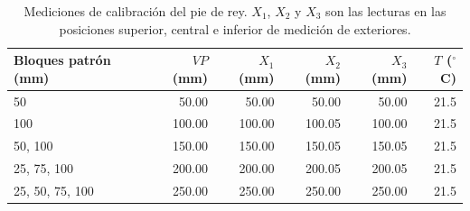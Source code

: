 \begin{table}[H]
\centering
\caption{Mediciones de calibración del pie de rey. $X_1$, $X_2$ y $X_3$ son las lecturas en las posiciones superior, central e inferior de medición de exteriores.}
\label{tab:pie-rey-datos}
\begin{tabular}{lrrrrr}
\toprule
Bloques patrón (mm) & $VP$ (mm) & $X_1$ (mm) & $X_2$ (mm) & $X_3$ (mm) & $T$ ($^\circ$C) \\
\midrule
50 & 50.00 & 50.00 & 50.00 & 50.00 & 21.5 \\
100 & 100.00 & 100.00 & 100.05 & 100.00 & 21.5 \\
50, 100 & 150.00 & 150.00 & 150.05 & 150.05 & 21.5 \\
25, 75, 100 & 200.00 & 200.00 & 200.05 & 200.05 & 21.5 \\
25, 50, 75, 100 & 250.00 & 250.00 & 250.00 & 250.00 & 21.5 \\
\bottomrule
\end{tabular}
\end{table}
